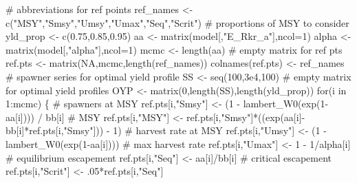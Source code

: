 \documentclass[
  11pt,
]{article}
\newenvironment{Shaded}{}{}
\newcommand{\CommentTok}[1]{\textcolor[rgb]{0.00,0.50,0.00}{#1}}
\newcommand{\ControlFlowTok}[1]{\textcolor[rgb]{0.00,0.00,1.00}{#1}}
\newcommand{\DataTypeTok}[1]{#1}
\newcommand{\DecValTok}[1]{#1}
\newcommand{\FloatTok}[1]{#1}
\newcommand{\KeywordTok}[1]{\textcolor[rgb]{0.00,0.00,1.00}{#1}}
\newcommand{\NormalTok}[1]{#1}
\newcommand{\OperatorTok}[1]{#1}
\newcommand{\OtherTok}[1]{\textcolor[rgb]{1.00,0.25,0.00}{#1}}
\newcommand{\StringTok}[1]{\textcolor[rgb]{0.00,0.50,0.50}{#1}}
\begin{document}
\begin{Shaded}
\begin{Highlighting}[]
\CommentTok{# abbreviations for ref points}
\NormalTok{ref_names <-}\StringTok{ }\KeywordTok{c}\NormalTok{(}\StringTok{"MSY"}\NormalTok{,}\StringTok{"Smsy"}\NormalTok{,}\StringTok{"Umsy"}\NormalTok{,}\StringTok{"Umax"}\NormalTok{,}\StringTok{"Seq"}\NormalTok{,}\StringTok{"Scrit"}\NormalTok{)}
\CommentTok{# proportions of MSY to consider}
\NormalTok{yld_prop <-}\StringTok{ }\KeywordTok{c}\NormalTok{(}\FloatTok{0.75}\NormalTok{,}\FloatTok{0.85}\NormalTok{,}\FloatTok{0.95}\NormalTok{)}
\NormalTok{aa <-}\StringTok{ }\KeywordTok{matrix}\NormalTok{(model[,}\StringTok{"E_Rkr_a"}\NormalTok{],}\DataTypeTok{ncol=}\DecValTok{1}\NormalTok{)}
\NormalTok{alpha <-}\StringTok{ }\KeywordTok{matrix}\NormalTok{(model[,}\StringTok{"alpha"}\NormalTok{],}\DataTypeTok{ncol=}\DecValTok{1}\NormalTok{)}
\NormalTok{mcmc <-}\StringTok{ }\KeywordTok{length}\NormalTok{(aa)}
\CommentTok{# empty matrix for ref pts}
\NormalTok{ref.pts <-}\StringTok{ }\KeywordTok{matrix}\NormalTok{(}\OtherTok{NA}\NormalTok{,mcmc,}\KeywordTok{length}\NormalTok{(ref_names))}
\KeywordTok{colnames}\NormalTok{(ref.pts) <-}\StringTok{ }\NormalTok{ref_names}
\CommentTok{# spawner series for optimal yield profile}
\NormalTok{SS <-}\StringTok{ }\KeywordTok{seq}\NormalTok{(}\DecValTok{100}\NormalTok{,}\FloatTok{3e4}\NormalTok{,}\DecValTok{100}\NormalTok{)}
\CommentTok{# empty matrix for optimal yield profiles}
\NormalTok{OYP <-}\StringTok{ }\KeywordTok{matrix}\NormalTok{(}\DecValTok{0}\NormalTok{,}\KeywordTok{length}\NormalTok{(SS),}\KeywordTok{length}\NormalTok{(yld_prop))}
\ControlFlowTok{for}\NormalTok{(i }\ControlFlowTok{in} \DecValTok{1}\OperatorTok{:}\NormalTok{mcmc) \{}
  \CommentTok{# spawners at MSY}
\NormalTok{  ref.pts[i,}\StringTok{"Smsy"}\NormalTok{] <-}\StringTok{ }\NormalTok{(}\DecValTok{1} \OperatorTok{-}\StringTok{ }\KeywordTok{lambert_W0}\NormalTok{(}\KeywordTok{exp}\NormalTok{(}\DecValTok{1}\OperatorTok{-}\NormalTok{aa[i]))) }\OperatorTok{/}\StringTok{ }\NormalTok{bb[i]}
  \CommentTok{# MSY}
\NormalTok{  ref.pts[i,}\StringTok{"MSY"}\NormalTok{] <-}\StringTok{ }\NormalTok{ref.pts[i,}\StringTok{"Smsy"}\NormalTok{]}\OperatorTok{*}\NormalTok{((}\KeywordTok{exp}\NormalTok{(aa[i]}\OperatorTok{-}\NormalTok{bb[i]}\OperatorTok{*}\NormalTok{ref.pts[i,}\StringTok{"Smsy"}\NormalTok{])) }\OperatorTok{-}\StringTok{ }\DecValTok{1}\NormalTok{)}
  \CommentTok{# harvest rate at MSY}
\NormalTok{  ref.pts[i,}\StringTok{"Umsy"}\NormalTok{] <-}\StringTok{ }\NormalTok{(}\DecValTok{1} \OperatorTok{-}\StringTok{ }\KeywordTok{lambert_W0}\NormalTok{(}\KeywordTok{exp}\NormalTok{(}\DecValTok{1}\OperatorTok{-}\NormalTok{aa[i])))}
  \CommentTok{# max harvest rate}
\NormalTok{  ref.pts[i,}\StringTok{"Umax"}\NormalTok{] <-}\StringTok{ }\DecValTok{1} \OperatorTok{-}\StringTok{ }\DecValTok{1}\OperatorTok{/}\NormalTok{alpha[i]}
  \CommentTok{# equilibrium escapement}
\NormalTok{  ref.pts[i,}\StringTok{"Seq"}\NormalTok{] <-}\StringTok{ }\NormalTok{aa[i]}\OperatorTok{/}\NormalTok{bb[i]}
  \CommentTok{# critical escapement}
\NormalTok{  ref.pts[i,}\StringTok{"Scrit"}\NormalTok{] <-}\StringTok{ }\FloatTok{.05}\OperatorTok{*}\NormalTok{ref.pts[i,}\StringTok{"Seq"}\NormalTok{]}
  

\end{Highlighting}
\end{Shaded}
\end{document}
